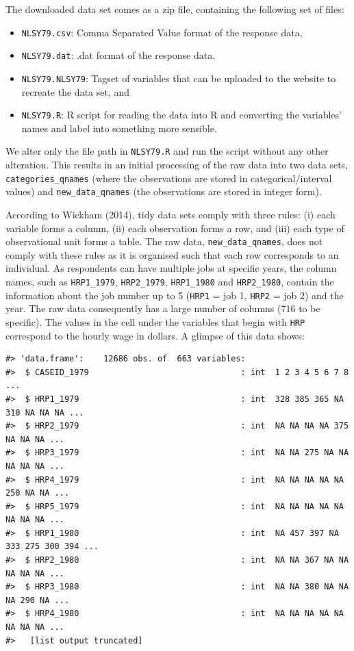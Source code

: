 \documentclass{article}
\begin{document}
The downloaded data set comes as a zip file, containing the following set of files:

\begin{itemize}
\tightlist
\item
  \texttt{NLSY79.csv}: Comma Separated Value format of the response data,
\item
  \texttt{NLSY79.dat}: .dat format of the response data,
\item
  \texttt{NLSY79.NLSY79}: Tagset of variables that can be uploaded to the website to recreate the data set, and
\item
  \texttt{NLSY79.R}: R script for reading the data into R and converting the variables' names and label into something more sensible.
\end{itemize}

We alter only the file path in \texttt{NLSY79.R} and run the script without any other alteration. This results in an initial processing of the raw data into two data sets, \texttt{categories\_qnames} (where the observations are stored in categorical/interval values) and \texttt{new\_data\_qnames} (the observations are stored in integer form).

According to Wickham (2014), tidy data sets comply with three rules: (i) each variable forms a column, (ii) each observation forms a row, and (iii) each type of observational unit forms a table. The raw data, \texttt{new\_data\_qnames}, does not comply with these rules as it is organised such that each row corresponds to an individual. As respondents can have multiple jobs at specific years, the column names, such as \texttt{HRP1\_1979}, \texttt{HRP2\_1979}, \texttt{HRP1\_1980} and \texttt{HRP2\_1980}, contain the information about the job number up to 5 (\texttt{HRP1} = job 1, \texttt{HRP2} = job 2) and the year. The raw data consequently has a large number of columns (716 to be specific). The values in the cell under the variables that begin with \texttt{HRP} correspond to the hourly wage in dollars. A glimpse of this data shows:

\begin{verbatim}
#> 'data.frame':    12686 obs. of  663 variables:
#>  $ CASEID_1979                               : int  1 2 3 4 5 6 7 8 ...
#>  $ HRP1_1979                                 : int  328 385 365 NA 310 NA NA NA ...
#>  $ HRP2_1979                                 : int  NA NA NA NA 375 NA NA NA ...
#>  $ HRP3_1979                                 : int  NA NA 275 NA NA NA NA NA ...
#>  $ HRP4_1979                                 : int  NA NA NA NA NA 250 NA NA ...
#>  $ HRP5_1979                                 : int  NA NA NA NA NA NA NA NA ...
#>  $ HRP1_1980                                 : int  NA 457 397 NA 333 275 300 394 ...
#>  $ HRP2_1980                                 : int  NA NA 367 NA NA NA NA NA ...
#>  $ HRP3_1980                                 : int  NA NA 380 NA NA NA 290 NA ...
#>  $ HRP4_1980                                 : int  NA NA NA NA NA NA NA NA ...
#>   [list output truncated]
\end{verbatim}
\end{document}
